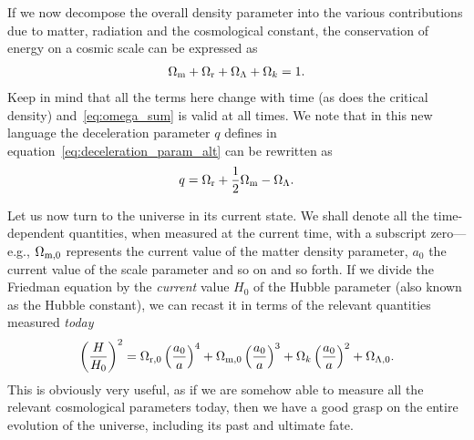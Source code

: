 If we now decompose the overall density parameter into the various contributions
due to matter, radiation and the cosmological constant, the conservation of energy
on a cosmic scale can be expressed as
\begin{align}\label{eq:omega_sum}
  \Omega_\text{m} + \Omega_\text{r} + \Omega_\Lambda + \Omega_k = 1.
\end{align}
Keep in mind that all the terms here change with time (as does the critical density)
and~\eqref{eq:omega_sum} is valid at all times.
We note that in this new language the deceleration parameter $q$ defines in
equation~\eqref{eq:deceleration_param_alt} can be rewritten as
\begin{align}
  q = \Omega_\text{r} + \frac{1}{2}\Omega_\text{m} - \Omega_\Lambda.
\end{align}

Let us now turn to the universe in its current state. We shall denote all the time-dependent
quantities, when measured at the current time, with a subscript zero---e.g., $\Omega_\text{m,0}$
represents the current value of the matter density parameter, $a_0$ the current value
of the scale parameter and so on and so forth. If we divide the Friedman equation
by the \emph{current} value $H_0$ of the Hubble parameter (also known as the Hubble
constant), we can recast it in terms of the relevant quantities measured
\emph{today}
\begin{align}\label{eq:friedman_today}
  \left( \frac{H}{H_0} \right)^2 =
  \Omega_\text{r,0} \left(\frac{a_0}{a}\right)^4 +
  \Omega_\text{m,0} \left(\frac{a_0}{a}\right)^3 +
  \Omega_k \left(\frac{a_0}{a}\right)^2 +
  \Omega_{\Lambda,0}.
\end{align}
This is obviously very useful, as if we are somehow able to measure all the relevant
cosmological parameters today, then we have a good grasp on the entire evolution
of the universe, including its past and ultimate fate.

